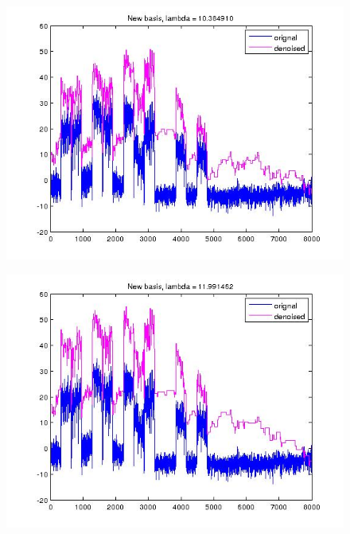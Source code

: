 \documentclass{article}
\begin{document}
\begin{figure}[h]
\centering
\includegraphics[height = 7.3 cm]{new_basis_ofcom_4.jpg}
\caption{}
\label{fig:new_basis_25}
\end{figure}

\begin{figure}[h]
\centering
\includegraphics[height = 7.3 cm]{new_basis_ofcom_5.jpg}
\caption{}
\label{fig:new_basis_25}
\end{figure}
\end{document}
